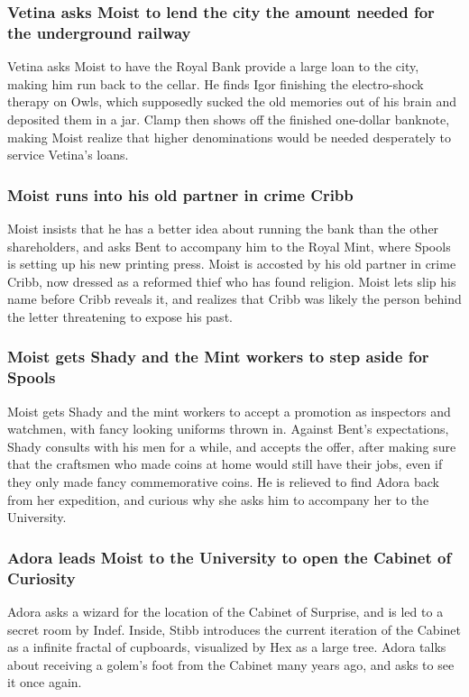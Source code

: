 \subsubsection{\Gls{Vetina} asks \Gls{Moist} to lend the city the amount needed for the underground
    railway}
\Gls{Vetina} asks \Gls{Moist} to have the Royal Bank provide a large loan to the city, making him
run back to the cellar. He finds \Gls{Igor} finishing the electro-shock therapy on \Gls{Owls},
which supposedly sucked the old memories out of his brain and deposited them in a jar. \Gls{Clamp}
then shows off the finished one-dollar banknote, making \Gls{Moist} realize that higher
denominations would be needed desperately to service \Gls{Vetina}'s loans.

\subsubsection{\Gls{Moist} runs into his old partner in crime \Gls{Cribb}}
\Gls{Moist} insists that he has a better idea about running the bank than the other shareholders,
and asks \Gls{Bent} to accompany him to the Royal Mint, where \Gls{Spools} is setting up his new
printing press. \Gls{Moist} is accosted by his old partner in crime \Gls{Cribb}, now dressed as a
reformed thief who has found religion. \Gls{Moist} lets slip his name before \Gls{Cribb} reveals it,
and realizes that \Gls{Cribb} was likely the person behind the letter threatening to expose his
past.

\subsubsection{\Gls{Moist} gets \Gls{Shady} and the Mint workers to step aside for \Gls{Spools}}
\Gls{Moist} gets \Gls{Shady} and the mint workers to accept a promotion as inspectors and watchmen,
with fancy looking uniforms thrown in. Against \Gls{Bent}'s expectations, \Gls{Shady} consults with
his men for a while, and accepts the offer, after making sure that the craftsmen who made coins at
home would still have their jobs, even if they only made fancy commemorative coins. He is relieved
to find \Gls{Adora} back from her expedition, and curious why she asks him to accompany her to the
University.

\subsubsection{\Gls{Adora} leads \Gls{Moist} to the University to open the Cabinet of Curiosity}
\Gls{Adora} asks a wizard for the location of the Cabinet of Surprise, and is led to a secret
room by \Gls{Indef}. Inside, \Gls{Stibb} introduces the current iteration of the Cabinet as a
infinite fractal of cupboards, visualized by \Gls{Hex} as a large tree. \Gls{Adora} talks about
receiving a golem's foot from the Cabinet many years ago, and asks to see it once again.

